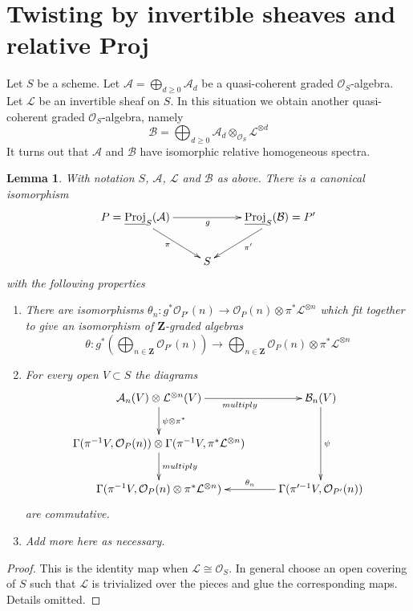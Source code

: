 \documentclass{stacks-project}
\theoremstyle{plain}
\newtheorem{lemma}[subsection]{Lemma}
\theoremstyle{definition}
\theoremstyle{remark}
\numberwithin{equation}{subsection}
\begin{document}
\section{Twisting by invertible sheaves and relative Proj}
\label{section-twisting-and-proj}

\noindent
Let $S$ be a scheme.
Let $\mathcal{A} = \bigoplus_{d \geq 0} \mathcal{A}_d$ be a
quasi-coherent graded $\mathcal{O}_S$-algebra.
Let $\mathcal{L}$ be an invertible sheaf on $S$.
In this situation we obtain another quasi-coherent graded
$\mathcal{O}_S$-algebra, namely
$$
\mathcal{B}
=
\bigoplus\nolimits_{d \geq 0}
\mathcal{A}_d \otimes_{\mathcal{O}_S} \mathcal{L}^{\otimes d}
$$
It turns out that $\mathcal{A}$ and $\mathcal{B}$ have
isomorphic relative homogeneous spectra.

\begin{lemma}
\label{lemma-twisting-and-proj}
With notation $S$, $\mathcal{A}$, $\mathcal{L}$ and $\mathcal{B}$ as
above. There is a canonical isomorphism
$$
\xymatrix{
P = \underline{\text{Proj}}_S(\mathcal{A})
\ar[rr]_g \ar[rd]_\pi & &
\underline{\text{Proj}}_S(\mathcal{B}) = P'
\ar[ld]^{\pi'} \\
& S &
}
$$
with the following properties
\begin{enumerate}
\item There are isomorphisms
$\theta_n : g^*\mathcal{O}_{P'}(n)
\to
\mathcal{O}_P(n) \otimes \pi^*\mathcal{L}^{\otimes n}$
which fit together to give an isomorphism of $\mathbf{Z}$-graded
algebras
$$
\theta :
g^*\left(
\bigoplus\nolimits_{n \in \mathbf{Z}} \mathcal{O}_{P'}(n)
\right)
\longrightarrow
\bigoplus\nolimits_{n \in \mathbf{Z}} \mathcal{O}_P(n)
\otimes \pi^*\mathcal{L}^{\otimes n}
$$
\item For every open $V \subset S$ the diagrams
$$
\xymatrix{
\mathcal{A}_n(V) \otimes \mathcal{L}^{\otimes n}(V)
\ar[r]_{multiply} \ar[d]^{\psi \otimes \pi^*}
&
\mathcal{B}_n(V) \ar[dd]^\psi \\
\Gamma(\pi^{-1}V, \mathcal{O}_P(n)) \otimes
\Gamma(\pi^{-1}V, \pi^*\mathcal{L}^{\otimes n})
\ar[d]^{multiply} \\
\Gamma(\pi^{-1}V, \mathcal{O}_P(n) \otimes \pi^*\mathcal{L}^{\otimes n})
&
\Gamma(\pi'^{-1}V, \mathcal{O}_{P'}(n)) \ar[l]_-{\theta_n}
}
$$
are commutative.
\item Add more here as necessary.
\end{enumerate}
\end{lemma}

\begin{proof}
This is the identity map when $\mathcal{L} \cong \mathcal{O}_S$.
In general choose an open covering of $S$ such that $\mathcal{L}$
is trivialized over the pieces and glue the corresponding maps.
Details omitted.
\end{proof}
\end{document}
